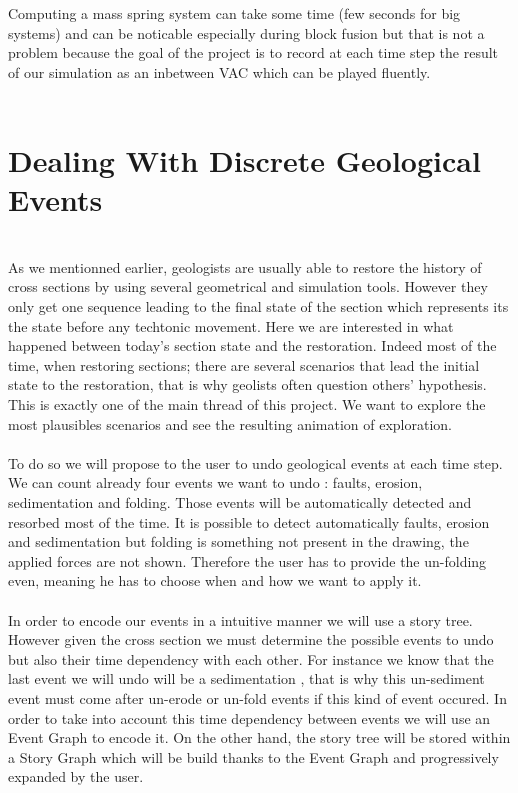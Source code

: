 \documentclass[12pt, a4paper]{memoir} %
\begin{document}
Computing a mass spring system can take some time (few seconds for big systems) and can be noticable especially during block fusion but that is not a problem because the goal of the project is to record at each time step the result of our simulation as an inbetween VAC which can be played fluently.\\\\

\section{Dealing With Discrete Geological Events}\\

As we mentionned earlier, geologists are usually able to restore the history of cross sections by using several geometrical and simulation tools. However they only get one sequence leading to the final state of the section which represents its the state before any techtonic movement. Here we are interested in what happened between today's section state and the restoration. Indeed most of the time, when restoring sections; there are several scenarios that lead the initial state to the restoration, that is why geolists often question others' hypothesis. This is exactly one of the main thread of this project. We want to explore the most plausibles scenarios and see the resulting animation of exploration.\\\\
To do so we will propose to the user to undo geological events at each time step. We can count already four events we want to undo : faults, erosion, sedimentation and  folding. Those events will be automatically detected and resorbed most of the time. It is possible to detect automatically faults, erosion and sedimentation but folding is something not present in the drawing, the applied forces are not shown. Therefore the user has to provide the un-folding even, meaning he has to choose when and how we want to apply it.\\\\ 

In order to encode our events in a intuitive manner we will use a story tree. However given the cross section we must determine the possible events to undo but also their time dependency with each other. For instance we know that the last event we will undo will be a sedimentation , that is why this un-sediment event must come after un-erode or un-fold events if this kind of event occured. In order to take into account this time dependency between events we will use an Event Graph to encode it. On the other hand, the story tree will be stored within a Story Graph which will be build thanks to the Event Graph and progressively expanded by the user.\\\\
\end{document}

